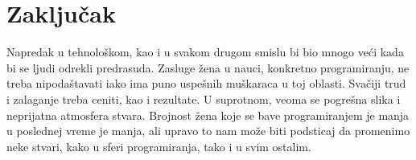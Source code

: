 \documentclass[a4paper,12pt]{article}
\begin{document}
\section{Zaključak}
\begin{flushleft}
Napredak u tehnološkom, kao i u svakom drugom smislu bi bio mnogo veći kada bi se ljudi odrekli predrasuda. Zasluge žena  u nauci, konkretno programiranju, ne treba nipodaštavati iako ima puno uspešnih muškaraca u toj oblasti. Svačiji trud i zalaganje treba ceniti, kao i rezultate. U suprotnom, veoma se pogrešna slika i neprijatna atmosfera stvara. Brojnost žena koje se bave programiranjem je manja u poslednej vreme je manja, ali upravo to nam može biti podsticaj da promenimo neke stvari, kako u sferi programiranja, tako i u svim ostalim.
\end{flushleft}

\newpage



\cite{ashcraft2016women}
\cite{branson2018future}
\cite{mauchly1980eniac}
\cite{punt2018ada}
\cite{actionmargaret}
\end{document}

